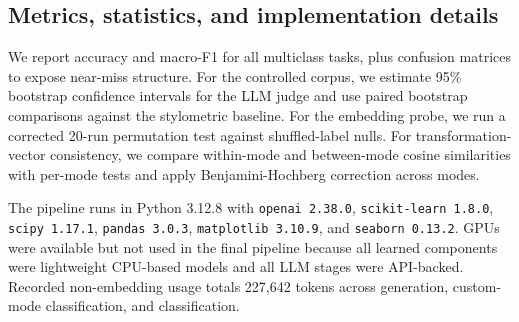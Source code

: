 \subsection{Metrics, statistics, and implementation details}

We report accuracy and macro-F1 for all multiclass tasks, plus confusion matrices to expose near-miss structure. For the controlled corpus, we estimate 95\% bootstrap confidence intervals for the LLM judge and use paired bootstrap comparisons against the stylometric baseline. For the embedding probe, we run a corrected 20-run permutation test against shuffled-label nulls. For transformation-vector consistency, we compare within-mode and between-mode cosine similarities with per-mode tests and apply Benjamini-Hochberg correction across modes.

The pipeline runs in Python 3.12.8 with \texttt{openai 2.38.0}, \texttt{scikit-learn 1.8.0}, \texttt{scipy 1.17.1}, \texttt{pandas 3.0.3}, \texttt{matplotlib 3.10.9}, and \texttt{seaborn 0.13.2}. GPUs were available but not used in the final pipeline because all learned components were lightweight CPU-based models and all LLM stages were API-backed. Recorded non-embedding usage totals 227,642 tokens across generation, custom-mode classification, and \semeval classification.
